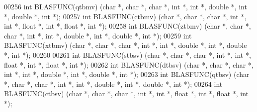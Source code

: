 \begin{DoxyCode}
00256 \textcolor{keywordtype}{int} BLASFUNC(qtbmv) (\textcolor{keywordtype}{char} *, \textcolor{keywordtype}{char} *, \textcolor{keywordtype}{char} *, \textcolor{keywordtype}{int} *, \textcolor{keywordtype}{int} *, \textcolor{keywordtype}{double} *, \textcolor{keywordtype}{int} *, \textcolor{keywordtype}{double} *, \textcolor{keywordtype}{int} *);
00257 \textcolor{keywordtype}{int} BLASFUNC(ctbmv) (\textcolor{keywordtype}{char} *, \textcolor{keywordtype}{char} *, \textcolor{keywordtype}{char} *, \textcolor{keywordtype}{int} *, \textcolor{keywordtype}{int} *, \textcolor{keywordtype}{float}  *, \textcolor{keywordtype}{int} *, \textcolor{keywordtype}{float}  *, \textcolor{keywordtype}{int} *);
00258 \textcolor{keywordtype}{int} BLASFUNC(ztbmv) (\textcolor{keywordtype}{char} *, \textcolor{keywordtype}{char} *, \textcolor{keywordtype}{char} *, \textcolor{keywordtype}{int} *, \textcolor{keywordtype}{int} *, \textcolor{keywordtype}{double} *, \textcolor{keywordtype}{int} *, \textcolor{keywordtype}{double} *, \textcolor{keywordtype}{int} *);
00259 \textcolor{keywordtype}{int} BLASFUNC(xtbmv) (\textcolor{keywordtype}{char} *, \textcolor{keywordtype}{char} *, \textcolor{keywordtype}{char} *, \textcolor{keywordtype}{int} *, \textcolor{keywordtype}{int} *, \textcolor{keywordtype}{double} *, \textcolor{keywordtype}{int} *, \textcolor{keywordtype}{double} *, \textcolor{keywordtype}{int} *);
00260 
00261 \textcolor{keywordtype}{int} BLASFUNC(stbsv) (\textcolor{keywordtype}{char} *, \textcolor{keywordtype}{char} *, \textcolor{keywordtype}{char} *, \textcolor{keywordtype}{int} *, \textcolor{keywordtype}{int} *, \textcolor{keywordtype}{float}  *, \textcolor{keywordtype}{int} *, \textcolor{keywordtype}{float}  *, \textcolor{keywordtype}{int} *);
00262 \textcolor{keywordtype}{int} BLASFUNC(dtbsv) (\textcolor{keywordtype}{char} *, \textcolor{keywordtype}{char} *, \textcolor{keywordtype}{char} *, \textcolor{keywordtype}{int} *, \textcolor{keywordtype}{int} *, \textcolor{keywordtype}{double} *, \textcolor{keywordtype}{int} *, \textcolor{keywordtype}{double} *, \textcolor{keywordtype}{int} *);
00263 \textcolor{keywordtype}{int} BLASFUNC(qtbsv) (\textcolor{keywordtype}{char} *, \textcolor{keywordtype}{char} *, \textcolor{keywordtype}{char} *, \textcolor{keywordtype}{int} *, \textcolor{keywordtype}{int} *, \textcolor{keywordtype}{double} *, \textcolor{keywordtype}{int} *, \textcolor{keywordtype}{double} *, \textcolor{keywordtype}{int} *);
00264 \textcolor{keywordtype}{int} BLASFUNC(ctbsv) (\textcolor{keywordtype}{char} *, \textcolor{keywordtype}{char} *, \textcolor{keywordtype}{char} *, \textcolor{keywordtype}{int} *, \textcolor{keywordtype}{int} *, \textcolor{keywordtype}{float}  *, \textcolor{keywordtype}{int} *, \textcolor{keywordtype}{float}  *, \textcolor{keywordtype}{int} *);

\end{DoxyCode}
